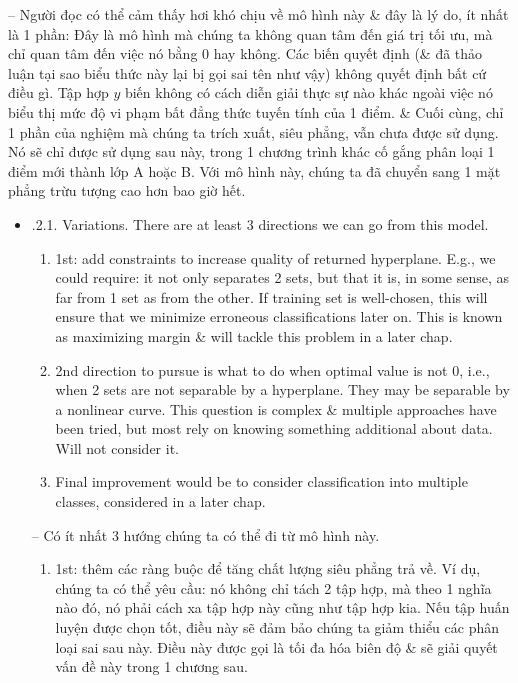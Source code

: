 \documentclass{article}
\begin{document}
\begin{itemize}
\begin{itemize}
\begin{itemize}
            -- Người đọc có thể cảm thấy hơi khó chịu về mô hình này \& đây là lý do, ít nhất là 1 phần: Đây là mô hình mà chúng ta không quan tâm đến giá trị tối ưu, mà chỉ quan tâm đến việc nó bằng 0 hay không. Các biến quyết định (\& đã thảo luận tại sao biểu thức này lại bị gọi sai tên như vậy) không quyết định bất cứ điều gì. Tập hợp $y$ biến không có cách diễn giải thực sự nào khác ngoài việc nó biểu thị mức độ vi phạm bất đẳng thức tuyến tính của 1 điểm. \& Cuối cùng, chỉ 1 phần của nghiệm mà chúng ta trích xuất, siêu phẳng, vẫn chưa được sử dụng. Nó sẽ chỉ được sử dụng sau này, trong 1 chương trình khác cố gắng phân loại 1 điểm mới thành lớp A hoặc B. Với mô hình này, chúng ta đã chuyển sang 1 mặt phẳng trừu tượng cao hơn bao giờ hết.
            \begin{itemize}
                \item {.2.1. Variations.} There are at least 3 directions we can go from this model.
                \begin{enumerate}
                    \item 1st: add constraints to increase quality of returned hyperplane. E.g., we could require: it not only separates 2 sets, but that it is, in some sense, as far from 1 set as from the other. If training set is well-chosen, this will ensure that we minimize erroneous classifications later on. This is known as maximizing margin \& will tackle this problem in a later chap.
                    \item 2nd direction to pursue is what to do when optimal value is not 0, i.e., when 2 sets are not separable by a hyperplane. They may be separable by a nonlinear curve. This question is complex \& multiple approaches have been tried, but most rely on knowing something additional about data. Will not consider it.
                    \item Final improvement would be to consider classification into multiple classes, considered in a later chap.
                \end{enumerate}
                -- Có ít nhất 3 hướng chúng ta có thể đi từ mô hình này.
                \begin{enumerate}
                    \item 1st: thêm các ràng buộc để tăng chất lượng siêu phẳng trả về. Ví dụ, chúng ta có thể yêu cầu: nó không chỉ tách 2 tập hợp, mà theo 1 nghĩa nào đó, nó phải cách xa tập hợp này cũng như tập hợp kia. Nếu tập huấn luyện được chọn tốt, điều này sẽ đảm bảo chúng ta giảm thiểu các phân loại sai sau này. Điều này được gọi là tối đa hóa biên độ \& sẽ giải quyết vấn đề này trong 1 chương sau.

\end{enumerate}
\end{itemize}
\end{itemize}
\end{itemize}
\end{itemize}
\end{document}
